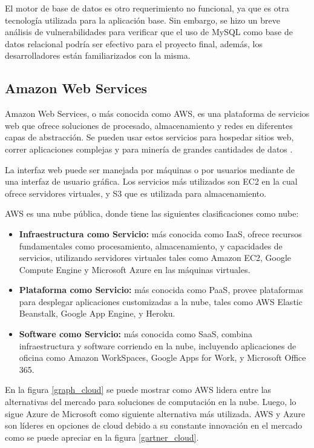 El motor de base de datos es otro requerimiento no funcional, ya que es otra tecnología utilizada para la aplicación base. Sin embargo, se hizo un breve análisis de vulnerabilidades para verificar que el uso de MySQL como base de datos relacional podría ser efectivo para el proyecto final, además, los desarrolladores están familiarizados con la misma.

\subsection{Amazon Web Services}
Amazon Web Services, o más conocida como AWS, es una plataforma de servicios web que ofrece soluciones de procesado, almacenamiento y redes en diferentes capas de abstracción. Se pueden usar estos servicios para hospedar sitios web, correr aplicaciones complejas y para minería de grandes cantidades de datos \citep{wittig2015amazon}. 

La interfaz web puede ser manejada por máquinas o por usuarios mediante de una interfaz de usuario gráfica. Los servicios más utilizados son EC2 en la cual ofrece servidores virtuales, y S3 que es utilizada para almacenamiento.

AWS es una nube pública, donde tiene las siguientes clasificaciones como nube:
\begin{itemize}
	\item \textbf{Infraestructura como Servicio:} más conocida como IaaS, ofrece recursos fundamentales como procesamiento, almacenamiento, y capacidades de servicios, utilizando servidores virtuales tales como Amazon EC2, Google Compute Engine y Microsoft Azure en las máquinas virtuales.
	\item \textbf{Plataforma como Servicio:} más conocida como PaaS, provee plataformas para desplegar aplicaciones customizadas a la nube, tales como AWS Elastic Beanstalk, Google App Engine, y Heroku.
	\item \textbf{Software como Servicio:} más conocida como SaaS, combina infraestructura y software corriendo en la nube, incluyendo aplicaciones de oficina como Amazon WorkSpaces, Google Apps for Work, y Microsoft Office 365.
\end{itemize}

En la figura \ref{graph_cloud} se puede mostrar como AWS lidera entre las alternativas del mercado para soluciones de computación en la nube. Luego, lo sigue Azure de Microsoft como siguiente alternativa más utilizada. AWS y Azure son líderes en opciones de cloud debido a su constante innovación en el mercado como se puede apreciar en la figura \ref{gartner_cloud}.

